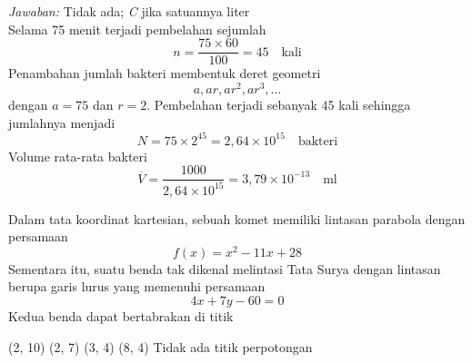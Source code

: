 \documentclass[11pt,fleqn, a4paper]{exam}
\begin{document}
\begin{questions}
\textit{Jawaban:} Tidak ada; \textit{C} jika satuannya liter\\
Selama 75 menit terjadi pembelahan sejumlah 
\begin{equation*}
n = \frac{75 \times 60}{100} = 45 \quad \text{kali}
\end{equation*}
Penambahan jumlah bakteri membentuk deret geometri
\begin{equation*}
a, ar, ar^2, ar^3, \dots
\end{equation*}
dengan $a = 75$ dan $r = 2$. Pembelahan terjadi sebanyak 45 kali sehingga jumlahnya menjadi
\begin{equation*}
N = 75 \times 2^{45} = 2,64 \times 10^{15} \quad \text{bakteri}
\end{equation*}
Volume rata-rata bakteri 
\begin{equation*}
\overline{V} = \frac{1000}{2,64 \times 10^{15}} = 3,79 \times 10^{-13} \quad \text{ml}
\end{equation*}


\vspace{0.5cm}
\question Dalam tata koordinat kartesian, sebuah komet memiliki lintasan parabola dengan persamaan
\begin{equation*}
f(x) = x^2 - 11x + 28
\end{equation*}
Sementara itu, suatu benda tak dikenal melintasi Tata Surya dengan lintasan berupa garis lurus yang memenuhi persamaan
\begin{equation*}
4x + 7y - 60 = 0
\end{equation*}
Kedua benda dapat bertabrakan di titik
\begin{choices}
\choice (2, 10)
\choice (2, 7)
\choice (3, 4)
\choice (8, 4)
\choice Tidak ada titik perpotongan
\end{choices}


\end{questions}
\end{document}
